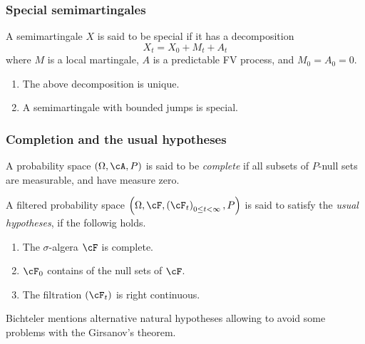 \begin{frame}
    \frametitle{Special semimartingales}
    
    A semimartingale $X$ is said to be special if it has a 
    decomposition 
    \begin{equation}
        X_t = X_0 + M_t + A_t
    \end{equation}
    where $M$ is a local martingale, $A$ is a predictable FV process, and $M_0=A_0=0$.

    \begin{enumerate}
        \item The above decomposition is unique.
        \item A semimartingale with bounded jumps is special.
    \end{enumerate}
\end{frame}


\begin{frame}
    \frametitle{Completion and the usual hypotheses}
    
    A probability space $\left( \Omega, \cA, P \right)$ is said to be
    \emph{complete} if all subsets of $P$-null sets are measurable, and have
    measure zero.
    \vfill

    A filtered probability space $\left( \Omega, \cF, \left( \cF_t
    \right)_{0\leq t < \infty}, P \right)$ is said to satisfy the \emph{usual
    hypotheses}, if the followig holds.
    \begin{enumerate}
        \item The $\sigma$-algera $\cF$ is complete.
        \item $\cF_0$ contains of the null sets of $\cF$. 
        \item The filtration $\left( \cF_t \right)$ is right continuous. 
    \end{enumerate}

    \vfill
    Bichteler mentions alternative natural hypotheses allowing to avoid
    some problems with the Girsanov's theorem. 
\end{frame}













